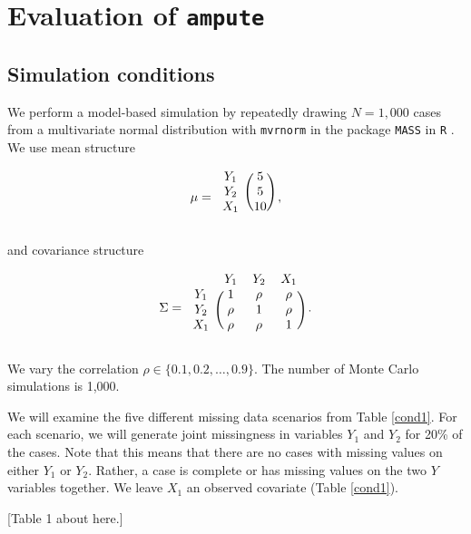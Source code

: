 \documentclass[]{interact}
\newcommand{\code}[1]{\texttt{#1}}
\begin{document}
\section{Evaluation of \code{ampute}}\label{evaluation}

\subsection{Simulation conditions}

We perform a model-based simulation by repeatedly drawing $N = 1,000$ cases from a multivariate normal distribution with \code{mvrnorm} in the package \code{MASS} \citep{MASS} in \code{R} \citep{R}. We use mean structure

\[
\mu = 
\begin{blockarray}{cc}
\begin{block}{c(c)}
Y_1&5\\
Y_2&5\\
X_1&10\\
\end{block}
\end{blockarray}\hspace{1mm},
\]

\noindent and covariance structure  

\[
\Sigma = 
\begin{blockarray}{ccccc}
& Y_1 & Y_2 & X_1\\
\begin{block}{c(cccc)}
Y_1 & 1 & \rho & \rho \\
Y_2 & \rho & 1 & \rho \\
X_1 & \rho & \rho & 1 \\
\end{block}
\end{blockarray}\hspace{1mm}. 
\]

\noindent We vary the correlation $\rho \in \{0.1, 0.2, \dots, 0.9\}$. The number of Monte Carlo simulations is 1,000.

We will examine the five different missing data scenarios from Table \ref{cond1}. For each scenario, we will generate joint missingness in variables $Y_1$ and $Y_2$ for 20\% of the cases. Note that this means that there are no cases with missing values on either $Y_1$ or $Y_2$. Rather, a case is complete or has missing values on the two $Y$ variables together. We leave $X_1$ an observed covariate (Table \ref{cond1}). 

[Table 1 about here.]
\end{document}
